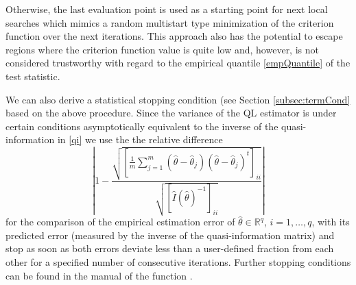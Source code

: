 \documentclass[article, nojss]{jss}
\numberwithin{equation}{section}			%
\newcommand{\Rq}{\mathbb{R}^{q}}
\begin{document}
Otherwise, the last evaluation point is used as a starting point
for next local searches which mimics a random multistart type minimization
of the criterion function over the next iterations. This approach also has the
potential to escape regions where the criterion function value is quite low and,
however, is not considered trustworthy with regard to the empirical
quantile \eqref{empQuantile} of the test statistic.\par
%
We can also derive a statistical stopping condition (see Section
\ref{subsec:termCond} based on the above procedure. Since the variance of the QL
estimator is under certain conditions asymptotically equivalent to the inverse of the
quasi-information in \eqref{qi} we use the the relative difference
\begin{equation}\label{relDif}
 \left|1-\frac{ \sqrt{\left[\frac{1}{m}\sum_{j=1}^m (\hat{\theta}-\hat{\theta}_j)(\hat{\theta}-\hat{\theta}_j)^{t}\right]_{ii}}}{ \sqrt{\left[\hat{I}(\hat{\theta})^{-1}\right]_{ii}} }\right|
\end{equation} 
for the comparison of the empirical estimation error of $\hat{\theta}\in\Rq$,
$i=1,\ldots,q$, with its predicted error (measured by the inverse of the
quasi-information matrix) and stop as soon as both errors deviate less than a user-defined fraction from each other for a specified number of
consecutive iterations. Further stopping conditions can be found in the
 manual of the function .
%
\end{document}

